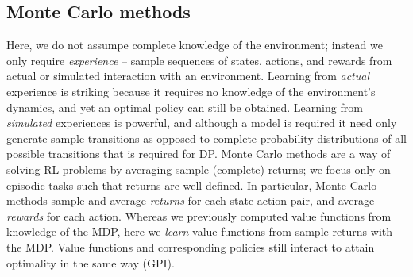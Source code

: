\documentclass[12pt]{article}
\begin{document}
\subsection{Monte Carlo methods}
Here, we do not assumpe complete knowledge of the environment; instead we only require \emph{experience} -- sample sequences of states, actions, and rewards from actual or simulated interaction with an environment. Learning from \emph{actual} experience is striking because it requires no knowledge of the environment's dynamics, and yet an optimal policy can still be obtained. Learning from \emph{simulated} experiences is powerful, and although a model is required it need only generate sample transitions as opposed to complete probability distributions of all possible transitions that is required for DP. Monte Carlo methods are a way of solving RL problems by averaging sample (complete) returns; we focus only on episodic tasks such that returns are well defined. In particular, Monte Carlo methods sample and average \emph{returns} for each state-action pair, and average \emph{rewards} for each action. Whereas we previously computed value functions from knowledge of the MDP, here we \emph{learn} value functions from sample returns with the MDP. Value functions and corresponding policies still interact to attain optimality in the same way (GPI).
\end{document}
